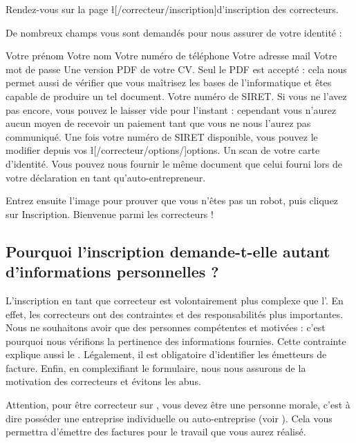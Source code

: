 ﻿Rendez-vous sur la page \l[/correcteur/inscription]{d'inscription des correcteurs}.

De nombreux champs vous sont demandés pour nous assurer de votre identité :
\begin{itemize}
\li Votre prénom
\li Votre nom
\li Votre numéro de téléphone
\li Votre adresse mail
\li Votre mot de passe
\li Une version PDF de votre CV.  Seul le PDF est accepté : cela nous permet aussi de vérifier que vous maîtrisez les bases de l'informatique et êtes capable de produire un tel document.
\li Votre numéro de SIRET.  Si vous ne l'avez pas encore, vous pouvez le laisser vide pour l'instant : cependant vous n'aurez aucun moyen de recevoir un paiement tant que vous ne nous l'aurez pas communiqué. Une fois votre numéro de SIRET disponible, vous pouvez le modifier depuis vos \l[/correcteur/options/]{options}.
\li Un scan de votre carte d'identité. Vous pouvez nous fournir le même document que celui fourni lors de votre déclaration en tant qu'auto-entrepreneur.
\end{itemize}

Entrez ensuite l'image pour prouver que vous n'êtes pas un robot, puis cliquez sur Inscription. Bienvenue parmi les correcteurs !

\subsection{Pourquoi l'inscription demande-t-elle autant d'informations personnelles ?}
L'inscription en tant que correcteur est volontairement plus complexe que l'. En effet, les correcteurs ont des contraintes et des responsabilités plus importantes. Nous ne souhaitons avoir que des personnes compétentes et motivées : c'est pourquoi nous vérifions la pertinence des informations fournies. Cette contrainte explique aussi le .
Légalement, il est obligatoire d'identifier les émetteurs de facture.
Enfin, en complexifiant le formulaire, nous nous assurons de la motivation des correcteurs et évitons les abus.

Attention, pour être correcteur sur \eDevoir, vous devez être une personne morale, c'est à dire posséder une entreprise individuelle ou auto-entreprise (voir ). Cela vous permettra d'émettre des factures pour le travail que vous aurez réalisé.